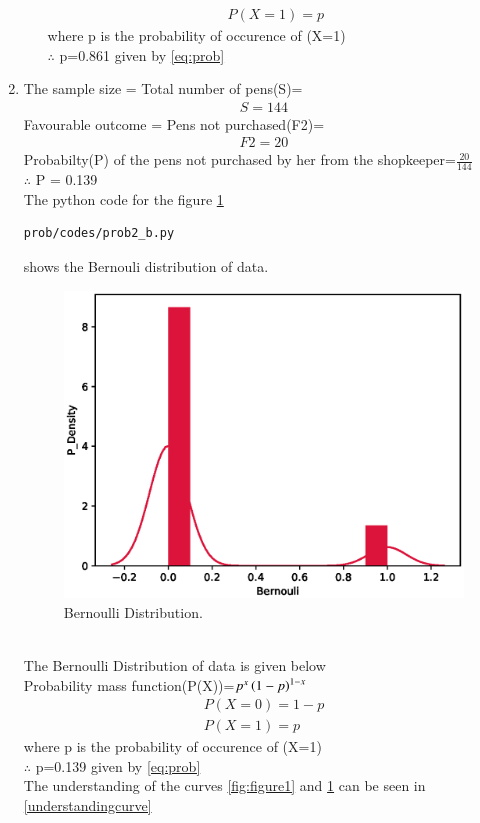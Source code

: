 \begin{enumerate}[label=\arabic*.,ref=\thesubsubsection.\theenumi]
\begin{enumerate}
\begin{align}
P(X=1)=p
\end{align}
where p is the probability of occurence of (X=1)
\\
$\therefore$ p=0.861 given by \ref{eq:prob}
\end{enumerate}
\item
The sample size = Total number of pens(S)=
\begin{align}
S=144
\end{align}
Favourable outcome = Pens not purchased(F2)=
\begin{align}
F2=20 
\end{align}
Probabilty(P) of the pens not purchased by her from the shopkeeper=$\frac{20}{144}$
\\
$\therefore$ P = 0.139
\label{eq:prob2}
\\
The python code for the figure \ref{fig:figure2}
\begin{lstlisting}
prob/codes/prob2_b.py
\end{lstlisting}
shows the Bernouli distribution of data.
\begin{figure}[!ht]
\centering
\includegraphics[width=\columnwidth]{./prob/figs/prob2_b.eps}
\caption{Bernoulli Distribution.}
\label{fig:figure2}
\end{figure}
\\
The Bernoulli Distribution of data is given below
\\
Probability mass function(P(X))=$p^x\left(1-p\right)^{1-x}$
\begin{align}
P(X=0)=1-p
\\
P(X=1)=p
\end{align}
where p is the probability of occurence of (X=1)
\\
$\therefore$ p=0.139 given by \ref{eq:prob}
\\
The understanding of the curves \ref{fig:figure1} and \ref{fig:figure2} can be seen in \eqref{understandingcurve}
\end{enumerate}